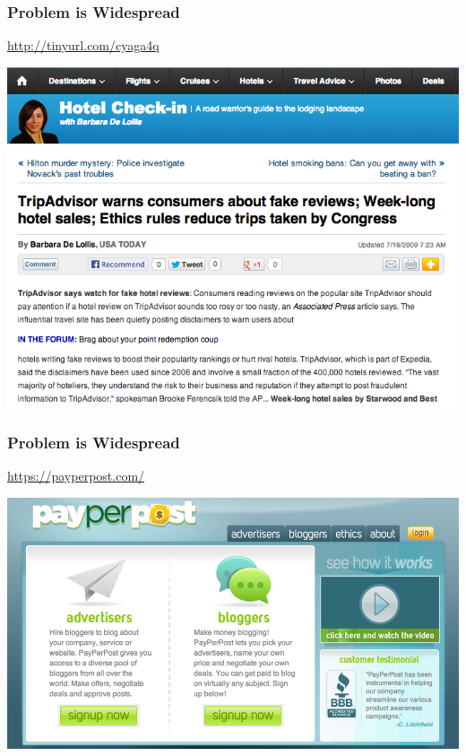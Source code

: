 \documentclass[t]{beamer}
\begin{document}
\begin{frame} \frametitle{Problem is Widespread} %


\begin{block}{\url{http://tinyurl.com/cyaga4q}} 

\begin{center}
     \includegraphics[width=\textwidth]{tripadvisor}
\end{center}

\end{block}


\end{frame}



\begin{frame} \frametitle{Problem is Widespread} %


\begin{block}{\url{https://payperpost.com/}}

\begin{center}
     \includegraphics[width=\textwidth]{payperpost}
\end{center}

\end{block}


\end{frame}
\end{document}
